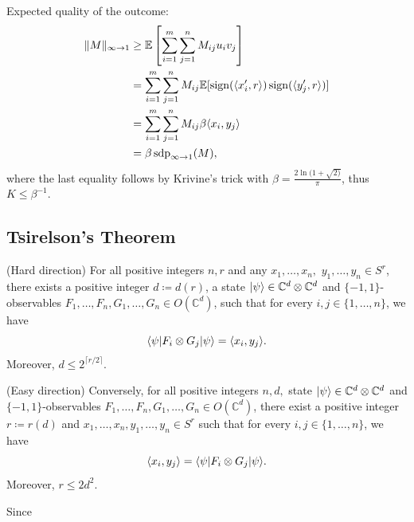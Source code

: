 	\begin{frame}
		\begin{pbmr}
			Expected quality of the outcome:
			\begin{align*}
				 \Vert {M} \Vert_{\infty\to 1} &\geq \mathbb{E}\left[\sum_{i=1}^m\sum_{j=1}^n M_{ij}u_iv_j\right]\\
				&= \sum_{i=1}^m\sum_{j=1}^n M_{ij} \mathbb{E}[\operatorname{sign}(\langle{x_i^\prime},{r}\rangle) \operatorname{sign}(\langle{y_j^\prime},{r}\rangle)] \\
				&=\sum_{i=1}^m\sum_{j=1}^n M_{ij}\beta \langle{x_i},{y_j}\rangle \\
				&=\beta \operatorname{sdp}_{\infty\to 1}(M),
			\end{align*}
			where the last equality follows by Krivine's trick with $\beta = \frac{2\ln(1+\sqrt{2)}}{\pi}$, thus $K\leq \beta^{-1}$.
		\end{pbmr}
	\end{frame}

\subsection{Tsirelson's Theorem}
\frame{\tableofcontents[currentsubsection]}

	\begin{frame}
		\begin{theo}[Tsirelson] \label{theo:Tsirelson}
			(Hard direction) For all positive integers $n, r$ and any $x_1,\dots,x_n,$ $y_1,\dots,y_n\in S^r$, there exists a positive integer $d\coloneqq d(r)$, a state $\vert {\psi} \rangle\in\mathbb{C}^d\otimes\mathbb{C}^d$ and $\{-1,1\}$-observables $F_1,\dots,F_n,G_1,\dots,G_n\in O(\mathbb{C}^d)$, such that for every $i,j\in\{1,\dots,n\}$, we have
			\begin{equation}
				\langle {\psi} \vert F_i\otimes G_j \vert {\psi} \rangle = \langle{x_i},{y_j}\rangle.
			\end{equation}
			Moreover, $d\leq 2^{\lceil r/2 \rceil}$.
			
			(Easy direction) Conversely, for all positive integers $n,d,$ state $\vert {\psi} \rangle\in \mathbb{C}^d\otimes\mathbb{C}^d$ and $\{-1,1\}$-observables $F_1,\dots,F_n,G_1,\dots,G_n\in O(\mathbb{C}^d)$, there exist a positive integer $r\coloneqq r(d)$ and $x_1,\dots,x_n,y_1,\dots,y_n\in S^r$ such that for every $i,j\in\{1,\dots,n\}$, we have
			\begin{equation}
				\langle{x_i},{y_j}\rangle = \langle {\psi} \vert F_i\otimes G_j \vert {\psi} \rangle.
			\end{equation}
			Moreover, $r\leq 2d^2$.
		\end{theo}
	\end{frame}
	\begin{frame}
		Since 
	\end{frame}

